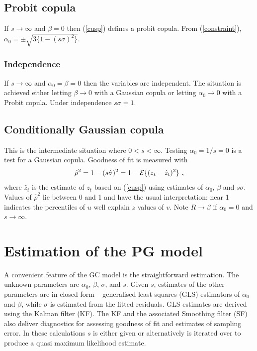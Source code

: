 \documentclass[authoryear]{elsarticle}
\newcommand{\Ex}{{\cal E}}
\newcommand{\eref}[1]{(\ref{#1})}
\newcommand{\be}[1]{\begin{equation}\label{#1}}
\newcommand{\ee}{\end{equation}}
\begin{document}
\subsection{Probit copula}


 If $s\rightarrow\infty$ and  $\beta=0$ then \eref{cusp} defines a probit copula.   From \eref{constraint}, $\alpha_0=\pm\sqrt{ 3\{1-(s\sigma)^2\}}$. 
 
 \subsubsection{Independence}
 If $s\rightarrow\infty$ and  $\alpha_0=\beta=0$ then the variables are independent.   The situation is achieved either letting $\beta\rightarrow 0$ with a Gaussian copula or letting $\alpha_0\rightarrow 0$ with a Probit copula.  Under independence $s\sigma=1$.  
 
 \subsection{Conditionally Gaussian copula}  

This is the intermediate situation where  $0<s<\infty$.  Testing $\alpha_0=1/s=0$ is a test for a Gaussian copula.   Goodness of fit is measured with 
\be{R2}
\hat\rho^2= 1-(s\hat\sigma)^2=1-\Ex\{(z_t-\hat z_t)^2\}\ ,
\ee
where  $\hat z_t$ is the estimate of $z_t$ based on \eref{cusp} using estimates of $\alpha_0$, $\beta$ and $s\sigma$.  
Values of $\hat\rho^2$ lie between 0 and 1 and have the usual interpretation:    near 1 indicates the percentiles of $u$ well explain $z$ values of $v$.   
Note $R\rightarrow\beta$  if $\alpha_0=0$ and $s\rightarrow \infty$.

\section{Estimation of the PG model}

A convenient feature of the GC model is the straightforward estimation.   The unknown parameters are $\alpha_0$, $\beta$, $\sigma$, and $s$.  Given $s$, estimates of the other parameters are in closed form -- generalised least squares (GLS) estimators of $\alpha_0$ and $\beta$, while $\sigma$ is estimated from the fitted  residuals.   GLS estimates are derived using the Kalman filter (KF).   The KF  and the associated Smoothing filter (SF) also deliver diagnostics for assessing goodness of fit and estimates of  sampling error.  In these calculations $s$ is either given or alternatively is iterated over to produce a quasi maximum likelihood estimate.
\end{document}

